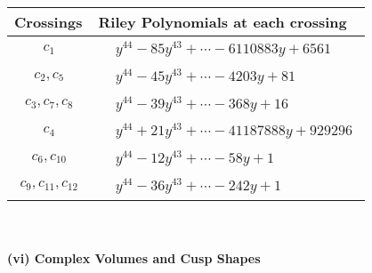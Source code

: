 \documentclass[1p]{elsarticle_modified}
\theoremstyle{definition}
\begin{document}
\begin{tabular}{m{50pt}|m{274pt}}
Crossings & \hspace{64pt}Riley Polynomials at each crossing \\
\hline $$\begin{aligned}c_{1}\end{aligned}$$&$\begin{aligned}
&y^{44}-85 y^{43}+\cdots-6110883 y+6561
\end{aligned}$\\
\hline $$\begin{aligned}c_{2},c_{5}\end{aligned}$$&$\begin{aligned}
&y^{44}-45 y^{43}+\cdots-4203 y+81
\end{aligned}$\\
\hline $$\begin{aligned}c_{3},c_{7},c_{8}\end{aligned}$$&$\begin{aligned}
&y^{44}-39 y^{43}+\cdots-368 y+16
\end{aligned}$\\
\hline $$\begin{aligned}c_{4}\end{aligned}$$&$\begin{aligned}
&y^{44}+21 y^{43}+\cdots-41187888 y+929296
\end{aligned}$\\
\hline $$\begin{aligned}c_{6},c_{10}\end{aligned}$$&$\begin{aligned}
&y^{44}-12 y^{43}+\cdots-58 y+1
\end{aligned}$\\
\hline $$\begin{aligned}c_{9},c_{11},c_{12}\end{aligned}$$&$\begin{aligned}
&y^{44}-36 y^{43}+\cdots-242 y+1
\end{aligned}$\\
\hline
\end{tabular}\\~\\
\newpage\flushleft \textbf{(vi) Complex Volumes and Cusp Shapes}
\end{document}
